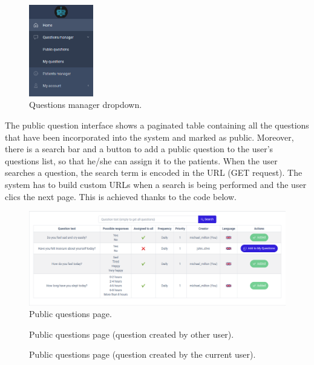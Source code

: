 \documentclass[12pt,english]{article}
\begin{document}
\begin{figure}[H]
    \centering
    \includegraphics[width=0.25\textwidth]{questions_dropdown.png}
    \caption{Questions manager dropdown.}
\end{figure}

The public question interface shows a paginated table containing all the questions that have been incorporated into the system and marked as public. Moreover, there is a search bar and a button to add a public question to the user's questions list, so that he/she can assign it to the patients. When the user searches a question, the search term is encoded in the URL (GET request). The system has to build custom URLs when a search is being performed and the user clics the next page. This is achieved thanks to the code below.

\begin{figure}[H]
    \centering
    \includegraphics[width=\textwidth]{public_questions.png}
    \caption{Public questions page.}
\end{figure}

\begin{figure}[H]
    \caption{Public questions page (question created by other user).}
\end{figure}

\begin{figure}[H]
    \caption{Public questions page (question created by the current user).}
\end{figure}
\end{document}
